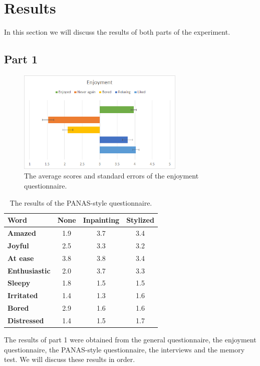 \documentclass[a4paper]{article}
\begin{document}
\section{Results}

In this section we will discuss the results of both parts of the experiment. %

\subsection{Part 1}

\begin{figure}
\centering
\includegraphics[width=8cm]{ResultsEnjoyment}
\caption{The average scores and standard errors of the enjoyment questionnaire.}
\label{fig:ResultsEnjoyment}
\end{figure}

\begin{table}[]
\centering
\begin{tabular}{|l|ccc|}
\cline{1-4}
\textbf{Word} & \textbf{None} & \textbf{Inpainting} & \textbf{Stylized} \\ \hline
\cline{1-4}
\textbf{Amazed}       & 1.9 & 3.7 & 3.4 \\
\textbf{Joyful}       & 2.5 & 3.3 & 3.2 \\
\textbf{At ease}      & 3.8 & 3.8 & 3.4 \\
\textbf{Enthusiastic} & 2.0 & 3.7 & 3.3 \\
\textbf{Sleepy}       & 1.8 & 1.5 & 1.5 \\
\textbf{Irritated}    & 1.4 & 1.3 & 1.6 \\
\textbf{Bored}        & 2.9 & 1.6 & 1.6 \\
\textbf{Distressed}   & 1.4 & 1.5 & 1.7 \\
\hline
\end{tabular}
\caption{\label{tab:panas}The results of the PANAS-style questionnaire.}
\label{t:panas}
\end{table}

The results of part 1 were obtained from the general questionnaire, the enjoyment questionnaire, the PANAS-style questionnaire, the interviews and the memory test. We will discuss these results in order.
\end{document}
